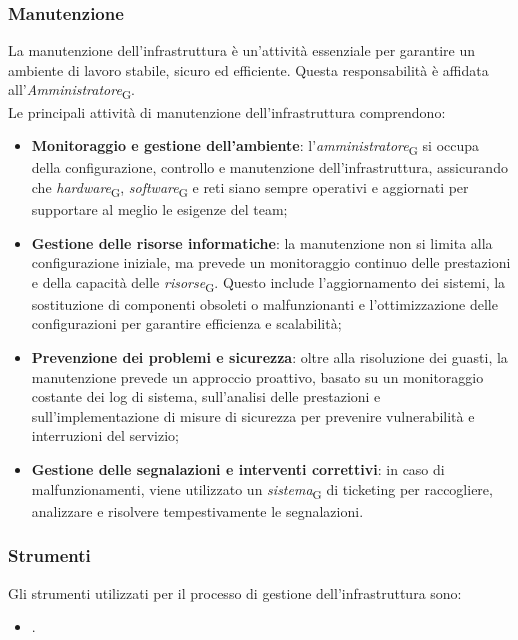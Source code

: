 \subsubsection{Manutenzione}
La manutenzione dell’infrastruttura è un’attività essenziale per garantire un ambiente di lavoro stabile, sicuro ed efficiente. Questa responsabilità è affidata all’\textit{Amministratore}\textsubscript{G}. \\
Le principali attività di manutenzione dell'infrastruttura comprendono:
\begin{itemize}
    \item \textbf{Monitoraggio e gestione dell’ambiente}: l'\textit{amministratore}\textsubscript{G} si occupa della configurazione, controllo e manutenzione dell’infrastruttura, assicurando che \textit{hardware}\textsubscript{G}, \textit{software}\textsubscript{G} e reti siano sempre operativi e aggiornati per supportare al meglio le esigenze del team;
    \item \textbf{Gestione delle risorse informatiche}: la manutenzione non si limita alla configurazione iniziale, ma prevede un monitoraggio continuo delle prestazioni e della capacità delle \textit{risorse}\textsubscript{G}. Questo include l'aggiornamento dei sistemi, la sostituzione di componenti obsoleti o malfunzionanti e l’ottimizzazione delle configurazioni per garantire efficienza e scalabilità;
    \item \textbf{Prevenzione dei problemi e sicurezza}: oltre alla risoluzione dei guasti, la manutenzione prevede un approccio proattivo, basato su un monitoraggio costante dei log di sistema, sull’analisi delle prestazioni e sull’implementazione di misure di sicurezza per prevenire vulnerabilità e interruzioni del servizio;
    \item \textbf{Gestione delle segnalazioni e interventi correttivi}: in caso di malfunzionamenti, viene utilizzato un \textit{sistema}\textsubscript{G} di ticketing per raccogliere, analizzare e risolvere tempestivamente le segnalazioni.
\end{itemize}

\subsubsection{Strumenti}
Gli strumenti utilizzati per il processo di gestione dell'infrastruttura sono:
\begin{itemize}
    \item {}.
\end{itemize}